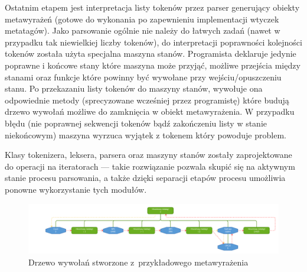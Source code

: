 \par
Ostatnim etapem jest interpretacja listy tokenów przez parser generujący obiekty metawyrażeń (gotowe do wykonania po zapewnieniu implementacji wtyczek metatagów).
Jako parsowanie ogólnie nie należy do łatwych zadań (nawet w przypadku tak niewielkiej liczby tokenów), do interpretacji poprawności kolejności tokenów została użyta specjalna maszyna stanów.
Programista deklaruje jedynie poprawne i końcowe stany które maszyna może przyjąć, możliwe przejścia między stanami oraz funkcje które powinny być wywołane przy wejściu/opuszczeniu stanu.
Po przekazaniu listy tokenów do maszyny stanów, wywołuje ona odpowiednie metody (sprecyzowane wcześniej przez programistę) które budują drzewo wywołań możliwe do zamknięcia w obiekt metawyrażenia.
W przypadku błędu (nie poprawnej sekwencji tokenów bądź zakończeniu listy w stanie niekońcowym) maszyna wyrzuca wyjątek z tokenem który powoduje problem.

\par
Klasy tokenizera, leksera, parsera oraz maszyny stanów zostały zaprojektowane do operacji na iteratorach --- takie rozwiązanie pozwala skupić się na aktywnym stanie procesu parsowania, a także dzięki separacji etapów procesu umożliwia ponowne wykorzystanie tych modułów.

\begin{figure}
\begin{center}
\includegraphics[scale=0.55]{img/metatag_expr_tree4.png}
\end{center}
\caption{Drzewo wywołań stworzone z~przykładowego metawyrażenia}
\label{metatag-expr-tree}
\end{figure}

